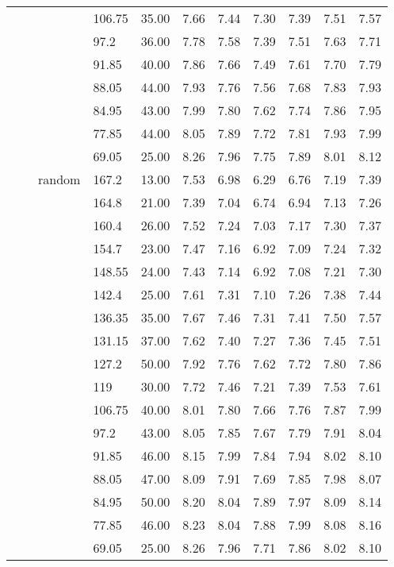 \begin{longtable}{llllrrrrrrr}
   &  &  & 106.75 & 35.00 & 7.66 & 7.44 & 7.30 & 7.39 & 7.51 & 7.57 \\ 
   &  &  & 97.2 & 36.00 & 7.78 & 7.58 & 7.39 & 7.51 & 7.63 & 7.71 \\ 
   &  &  & 91.85 & 40.00 & 7.86 & 7.66 & 7.49 & 7.61 & 7.70 & 7.79 \\ 
   &  &  & 88.05 & 44.00 & 7.93 & 7.76 & 7.56 & 7.68 & 7.83 & 7.93 \\ 
   &  &  & 84.95 & 43.00 & 7.99 & 7.80 & 7.62 & 7.74 & 7.86 & 7.95 \\ 
   &  &  & 77.85 & 44.00 & 8.05 & 7.89 & 7.72 & 7.81 & 7.93 & 7.99 \\ 
   &  &  & 69.05 & 25.00 & 8.26 & 7.96 & 7.75 & 7.89 & 8.01 & 8.12 \\ 
   &  & random & 167.2 & 13.00 & 7.53 & 6.98 & 6.29 & 6.76 & 7.19 & 7.39 \\ 
   &  &  & 164.8 & 21.00 & 7.39 & 7.04 & 6.74 & 6.94 & 7.13 & 7.26 \\ 
   &  &  & 160.4 & 26.00 & 7.52 & 7.24 & 7.03 & 7.17 & 7.30 & 7.37 \\ 
   &  &  & 154.7 & 23.00 & 7.47 & 7.16 & 6.92 & 7.09 & 7.24 & 7.32 \\ 
   &  &  & 148.55 & 24.00 & 7.43 & 7.14 & 6.92 & 7.08 & 7.21 & 7.30 \\ 
   &  &  & 142.4 & 25.00 & 7.61 & 7.31 & 7.10 & 7.26 & 7.38 & 7.44 \\ 
   &  &  & 136.35 & 35.00 & 7.67 & 7.46 & 7.31 & 7.41 & 7.50 & 7.57 \\ 
   &  &  & 131.15 & 37.00 & 7.62 & 7.40 & 7.27 & 7.36 & 7.45 & 7.51 \\ 
   &  &  & 127.2 & 50.00 & 7.92 & 7.76 & 7.62 & 7.72 & 7.80 & 7.86 \\ 
   &  &  & 119 & 30.00 & 7.72 & 7.46 & 7.21 & 7.39 & 7.53 & 7.61 \\ 
   &  &  & 106.75 & 40.00 & 8.01 & 7.80 & 7.66 & 7.76 & 7.87 & 7.99 \\ 
   &  &  & 97.2 & 43.00 & 8.05 & 7.85 & 7.67 & 7.79 & 7.91 & 8.04 \\ 
   &  &  & 91.85 & 46.00 & 8.15 & 7.99 & 7.84 & 7.94 & 8.02 & 8.10 \\ 
   &  &  & 88.05 & 47.00 & 8.09 & 7.91 & 7.69 & 7.85 & 7.98 & 8.07 \\ 
   &  &  & 84.95 & 50.00 & 8.20 & 8.04 & 7.89 & 7.97 & 8.09 & 8.14 \\ 
   &  &  & 77.85 & 46.00 & 8.23 & 8.04 & 7.88 & 7.99 & 8.08 & 8.16 \\ 
   &  &  & 69.05 & 25.00 & 8.26 & 7.96 & 7.71 & 7.86 & 8.02 & 8.10 \\ 

\end{longtable}
